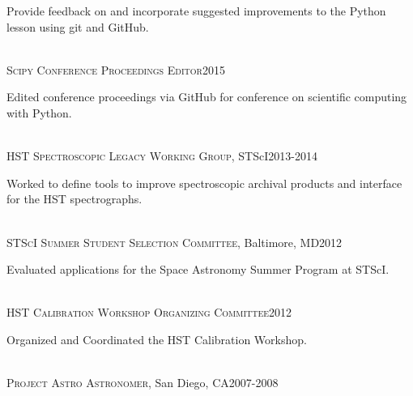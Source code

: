 \documentclass[10pt]{cv}
\begin{document}
\begin{llist}
\begin{minipage}[l]{0.7\textwidth}\vspace{0.15cm}
Provide feedback on and incorporate suggested improvements to the Python lesson using git and GitHub.\\
\end{minipage}\vspace{0.15cm}
\\
\textsc{Scipy Conference Proceedings Editor}\hfill 2015\\
\begin{minipage}[l]{0.7\textwidth}\vspace{0.15cm}
Edited conference proceedings via GitHub for conference on scientific computing with Python.\\
\end{minipage}\vspace{0.15cm}
\\
\textsc{HST Spectroscopic Legacy Working Group}, STScI\hfill2013-2014\\
\begin{minipage}[l]{0.7\textwidth}\vspace{0.15cm}
Worked to define tools to improve spectroscopic archival products and interface for the HST spectrographs.\\
\end{minipage}\vspace{0.15cm}
\\
\textsc{STScI Summer Student Selection Committee}, Baltimore, MD\hfill2012\\
\begin{minipage}[l]{0.7\textwidth}\vspace{0.15cm}
Evaluated applications for the Space Astronomy Summer Program at STScI.\\
\end{minipage}\vspace{0.15cm}
\\
\textsc{HST Calibration Workshop Organizing Committee}\hfill 2012\\
\begin{minipage}[l]{0.7\textwidth}\vspace{0.15cm}
Organized and Coordinated the HST Calibration Workshop.\\
\end{minipage}\vspace{0.15cm}
\\
\textsc{Project Astro Astronomer}, San Diego, CA\hfill 2007-2008\\
\begin{minipage}[l]{0.7\textwidth}\vspace{0.15cm}

\end{minipage}
\end{llist}
\end{document}
